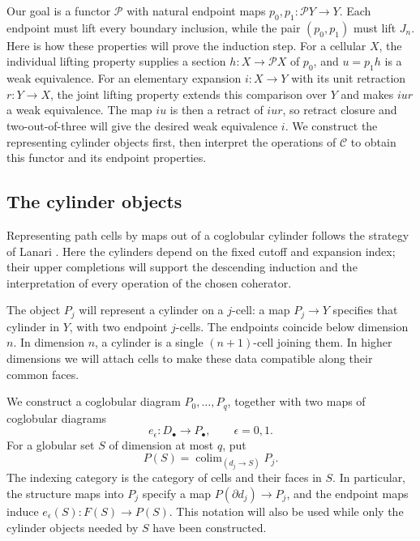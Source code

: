 \documentclass[11pt,letterpaper]{article}
\numberwithin{equation}{section}
\theoremstyle{plain}
\theoremstyle{definition}
\theoremstyle{remark}
\DeclareMathOperator*{\colim}{colim}
\begin{document}
Our goal is a functor \(\mathcal P\) with natural endpoint maps
\(p_0,p_1:\mathcal P Y\to Y\).  Each endpoint must lift every
boundary inclusion, while the pair \((p_0,p_1)\) must lift \(J_n\).
Here is how these properties will prove the induction step.  For a
cellular \(X\), the individual lifting property supplies a section
\(h:X\to\mathcal P X\) of \(p_0\), and \(u=p_1h\) is a weak
equivalence.  For an elementary expansion \(i:X\to Y\) with its
unit retraction \(r:Y\to X\), the joint lifting property extends
this comparison over \(Y\) and makes \(iur\) a weak equivalence.
The map \(iu\) is then a retract of \(iur\), so retract closure
and two-out-of-three will give the desired weak equivalence \(i\).
We construct the representing cylinder objects first, then interpret
the operations of \(\mathcal C\) to obtain this functor and its
endpoint properties.

\subsection{The cylinder objects}

Representing path cells by maps out of a coglobular cylinder follows
the strategy of Lanari
\cite[Definitions~5.2--5.3 and~6.1]{Lanari2020}.
Here the cylinders depend on the fixed cutoff and expansion index;
their upper completions will support the descending induction and
the interpretation of every operation of the chosen coherator.

The object \(P_j\) will represent a cylinder on a \(j\)-cell:
a map \(P_j\to Y\) specifies that cylinder in \(Y\), with two
endpoint \(j\)-cells.  The endpoints coincide below dimension \(n\).
In dimension \(n\), a cylinder is a single \((n+1)\)-cell joining
them.  In higher dimensions we will attach cells to make these data
compatible along their common faces.

We construct a coglobular diagram \(P_0,\ldots,P_q\), together with
two maps of coglobular diagrams
\[
             e_\epsilon:D_\bullet\longrightarrow P_\bullet,
             \qquad \epsilon=0,1.
\]
For a globular set \(S\) of dimension at most \(q\), put
\begin{equation}\label{eq:cylinder-realization}
 P(S)=\colim_{(d_j\longrightarrow S)}P_j.
\end{equation}
The indexing category is the category of cells and their faces in
\(S\).  In particular, the structure maps into \(P_j\) specify a
map \(P(\partial d_j)\to P_j\), and the endpoint maps induce
\(e_\epsilon(S):F(S)\to P(S)\).  This notation will also be used
while only the cylinder objects needed by \(S\) have been constructed.
\end{document}
